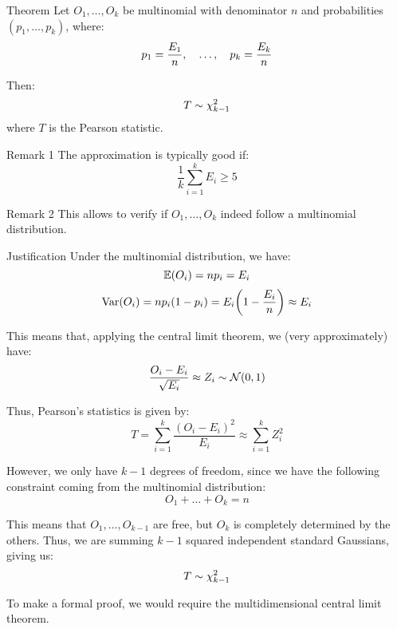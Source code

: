 \documentclass[a4paper]{article}
\begin{document}
\begin{parag}{Theorem}
    Let $O_1, \ldots, O_k$ be multinomial with denominator $n$ and probabilities $\left(p_1, \ldots, p_k\right)$, where: 
    \[p_1 = \frac{E_1}{n}, \quad \ldots, \quad p_k = \frac{E_k}{n}\]
    
    Then: 
    \[T \sim \chi_{k-1}^2 \]
    where $T$ is the Pearson statistic.
    
    \begin{subparag}{Remark 1}
        The approximation is typically good if: 
        \[\frac{1}{k}\sum_{i=1}^{k} E_i \geq 5\]
    \end{subparag}

    \begin{subparag}{Remark 2}
        This allows to verify if $O_1, \ldots, O_k$ indeed follow a multinomial distribution.
    \end{subparag}
    
    \begin{subparag}{Justification}
        Under the multinomial distribution, we have: 
        \[\exval\left(O_i\right) = n p_i = E_i\]
        \[\Var\left(O_i\right) = np_i\left(1 - p_i\right) = E_i \left(1 - \frac{E_i}{n}\right) \approx E_i\]
        
        This means that, applying the central limit theorem, we (very approximately) have: 
        \[\frac{O_i - E_i}{\sqrt{E_i}} \approx Z_i \followsdistr \mathcal{N}\left(0, 1\right)\]
        
        Thus, Pearson's statistics is given by: 
        \[T = \sum_{i=1}^{k} \frac{\left(O_i - E_i\right)^2}{E_i} \approx \sum_{i=1}^{k} Z_i^2\]
        
        However, we only have $k-1$ degrees of freedom, since we have the following constraint coming from the multinomial distribution: 
        \[O_1 + \ldots + O_k = n\]
        
        This means that $O_1, \ldots, O_{k-1}$ are free, but $O_k$ is completely determined by the others. Thus, we are summing $k-1$ squared independent standard Gaussians, giving us: 
        \[T \sim \chi_{k-1}^2 \]

        To make a formal proof, we would require the multidimensional central limit theorem.
    \end{subparag}
\end{parag}
\end{document}
